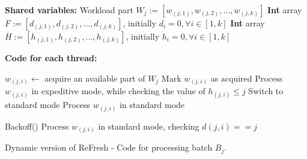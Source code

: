 \begin{algorithm}[htbp]
    \footnotesize
    \vspace*{2mm}
    
    \begin{algorithmic}[1]
    
    \State \textbf{Shared variables:}
    \State Workload part $\mathit{W_j} := \mathit{[w_(j,1), w_(j,2), \ldots, w_(j,k)]}$ \label{alg:DRefresh:w}
    \State \textbf{Int} array $\mathit{F} := \mathit{[d_(j,1), d_(j,2), \ldots, d_(j,k)]}$, initially $\mathit{d_i} = 0, \forall i \in [1, k]$ \label{alg:DRefresh:d}
    \State \textbf{Int} array $\mathit{H} := \mathit{[h_(j,1), h_(j,2), \ldots, h_(j,k)]}$, initially $\mathit{h_i} = 0, \forall i \in [1, k]$ \label{alg:DRefresh:h}
    
    \vspace*{1mm}
    \State \textbf{Code for each thread:}
    
         \label{alg:DRefresh:process:start}
            \State $\mathit{w_(j,i)} \gets$ acquire an available part of $\mathit{W_j}$
            \State Mark $\mathit{w_(j,i)}$ as acquired \label{alg:DFreSh:acquire-part}
             \label{alg:DRefresh:process:if}
                \State Process $\mathit{w_(j,i)}$ in expeditive mode, while checking the value of $h_(j,i) \leq j$ \label{alg:DRefresh:process:expeditive}
                \label{alg:DFreSh:switch-mode}
                    \State Switch to standard mode
                \EndIf
            \Else
                \State Process $\mathit{w_(j,i)}$ in standard mode \label{alg:DRefresh:process:standard}
            \EndIf
            \State {} \label{alg:DRefresh:d:increase}
        \EndWhile
        
         \label{alg:DRefresh:scan:ForAll} 
            \State Backoff() \label{alg:DRefresh:help:backoff}
            \State Process $\mathit{w_(j,i)}$ in standard mode, checking $\mathit{d(j,i)} == j$
            \label{alg:DRefresh:help:d:true}
        \EndFor
    \EndProcedure
    
    \end{algorithmic}
    
    \caption{Dynamic version of ReFresh - Code for processing batch $B_j$.}
    \label{alg:DRefresh}
    \end{algorithm}

